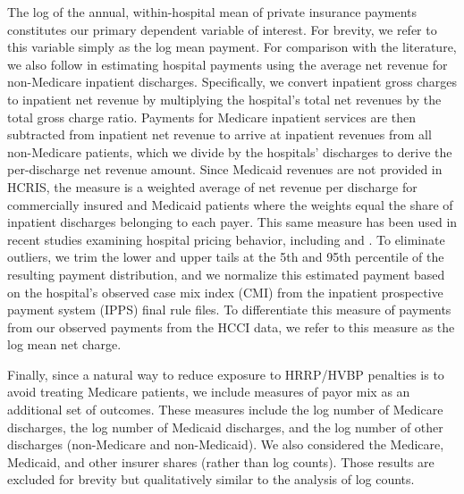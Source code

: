 \documentclass[12pt]{article}
\begin{document}
The log of the annual, within-hospital mean of private insurance payments constitutes our primary dependent variable of interest. For brevity, we refer to this variable simply as the log mean payment. For comparison with the literature, we also follow \cite{dafny2009} in estimating hospital payments using the average net revenue for non-Medicare inpatient discharges. Specifically, we convert inpatient gross charges to inpatient net revenue by multiplying the hospital's total net revenues by the total gross charge ratio. Payments for Medicare inpatient services are then subtracted from inpatient net revenue to arrive at inpatient revenues from all non-Medicare patients, which we divide by the hospitals' discharges to derive the per-discharge net revenue amount. Since Medicaid revenues are not provided in HCRIS, the measure is a weighted average of net revenue per discharge for commercially insured and Medicaid patients where the weights equal the share of inpatient discharges belonging to each payer. This same measure has been used in recent studies examining hospital pricing behavior, including \cite{schmitt2018} and \cite{lewis2015}. To eliminate outliers, we trim the lower and upper tails at the 5th and 95th percentile of the resulting payment distribution, and we normalize this estimated payment based on the hospital's observed case mix index (CMI) from the inpatient prospective payment system (IPPS) final rule files. To differentiate this measure of payments from our observed payments from the HCCI data, we refer to this measure as the log mean net charge.

Finally, since a natural way to reduce exposure to HRRP/HVBP penalties is to avoid treating Medicare patients, we include measures of payor mix as an additional set of outcomes. These measures include the log number of Medicare discharges, the log number of Medicaid discharges, and the log number of other discharges (non-Medicare and non-Medicaid). We also considered the Medicare, Medicaid, and other insurer shares (rather than log counts). Those results are excluded for brevity but qualitatively similar to the analysis of log counts.
\end{document}
